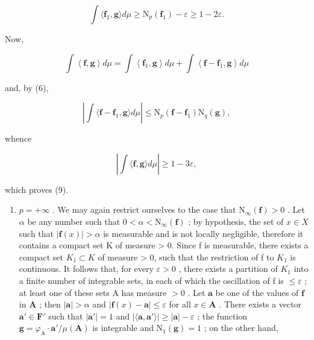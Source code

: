 \[
\int \langle \mathbf {f} _ {1}, \mathbf {g} \rangle d \mu \geqslant \mathrm{N} _ {p} (\mathbf {f} _ {1}) - \varepsilon \geqslant 1 - 2 \varepsilon .
\]

Now,

\[
\int \left\langle \mathbf {f}, \mathbf {g} \right\rangle d \mu = \int \left\langle \mathbf {f} _ {1}, \mathbf {g} \right\rangle d \mu + \int \left\langle \mathbf {f} - \mathbf {f} _ {1}, \mathbf {g} \right\rangle d \mu
\]

and, by (6),

\[
\left| \int \langle \mathbf {f} - \mathbf {f} _ {1}, \mathbf {g} \rangle d \mu \right| \leqslant \mathrm{N} _ {p} (\mathbf {f} - \mathbf {f} _ {1}) \mathrm{N} _ {q} (\mathbf {g}),
\]

whence

\[
\left| \int \langle \mathbf {f}, \mathbf {g} \rangle d \mu \right| \geqslant 1 - 3 \varepsilon ,
\]

which proves (9).

\begin{enumerate}
\def\labelenumi{(\roman{enumi})}
\setcounter{enumi}{1}
\tightlist
\item
  \(p = +\infty\) . We may again restrict ourselves to the case that \(\mathrm{N}_{\infty}(\mathbf{f}) > 0\) . Let \(\alpha\) be any number such that \(0 < \alpha < \mathrm{N}_{\infty}(\mathbf{f})\) ; by hypothesis, the set of \(x \in X\) such that \(|\mathbf{f}(x)| > \alpha\) is measurable and is not locally negligible, therefore it contains a compact set K of measure \textgreater{} 0. Since f is measurable, there exists a compact set \(K_{1} \subset K\) of measure \textgreater{} 0, such that the restriction of f to \(K_{1}\) is continuous. It follows that, for every \(\varepsilon > 0\) , there exists a partition of \(K_{1}\) into a finite number of integrable sets, in each of which the oscillation of f is \(\leqslant \varepsilon\) ; at least one of these sets A has measure \(>0\) . Let \(\mathbf{a}\) be one of the values of \(\mathbf{f}\) in \(\mathbf{A}\) ; then \(|\mathbf{a}| > \alpha\) and \(|\mathbf{f}(x) - \mathbf{a}| \leqslant \varepsilon\) for all \(x \in \mathbf{A}\) . There exists a vector \(\mathbf{a}' \in \mathbf{F}'\) such that \(|\mathbf{a}'| = 1\) and \(|\langle \mathbf{a}, \mathbf{a}' \rangle| \geqslant |\mathbf{a}| - \varepsilon\) ; the function \(\mathbf{g} = \varphi_{\mathrm{A}} \cdot \mathbf{a}' / \mu(\mathbf{A})\) is integrable and \(\mathrm{N}_1(\mathbf{g}) = 1\) ; on the other hand,
\end{enumerate}

